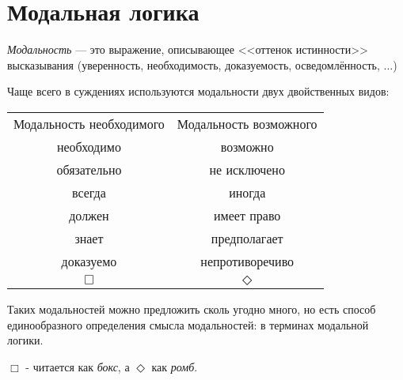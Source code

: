 \section{Модальная логика}

\begin{definition}
    \textit{Модальность} --- это выражение, описывающее <<оттенок истинности>>
    высказывания (уверенность, необходимость, доказуемость, осведомлённость, $\dots$)
\end{definition}

Чаще всего в суждениях используются модальности двух двойственных видов:

\begin{center}
\begin{tabular}{c c}
    Модальность необходимого & Модальность возможного \\
    необходимо & возможно \\
    обязательно & не исключено \\
    всегда & иногда \\
    должен & имеет право \\
    знает & предполагает \\
    доказуемо & непротиворечиво \\
    $\Box$ & $\Diamond$ \\
\end{tabular}
\end{center}

Таких модальностей можно предложить сколь угодно много, но есть способ 
единообразного определения смысла модальностей: в терминах модальной логики.

\begin{remark}
    $\Box$ - читается как \textit{бокс}, а $\Diamond$ как \textit{ромб}.
\end{remark}
